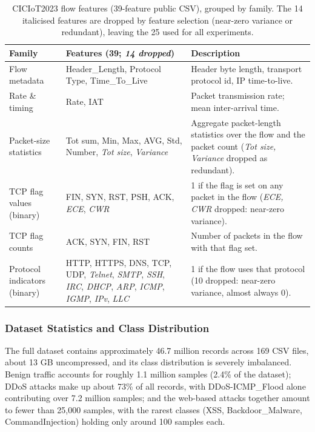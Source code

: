 \begin{table}[htbp]
\centering
\small
\begin{tabular}{|p{70pt}|p{150pt}|p{150pt}|}
\hline
\textbf{Family} & \textbf{Features (39; \emph{14 dropped})} & \textbf{Description} \\
\hline
Flow metadata & Header\_Length, Protocol Type, Time\_To\_Live &
Header byte length, transport protocol id, IP time-to-live. \\
\hline
Rate \& timing & Rate, IAT &
Packet transmission rate; mean inter-arrival time. \\
\hline
Packet-size statistics & Tot sum, Min, Max, AVG, Std, Number, \emph{Tot size}, \emph{Variance} &
Aggregate packet-length statistics over the flow and the packet count
(\emph{Tot size, Variance} dropped as redundant). \\
\hline
TCP flag values (binary) & FIN, SYN, RST, PSH, ACK, \emph{ECE}, \emph{CWR} &
1 if the flag is set on any packet in the flow (\emph{ECE, CWR} dropped: near-zero variance). \\
\hline
TCP flag counts & ACK, SYN, FIN, RST &
Number of packets in the flow with that flag set. \\
\hline
Protocol indicators (binary) & HTTP, HTTPS, DNS, TCP, UDP, \emph{Telnet}, \emph{SMTP}, \emph{SSH}, \emph{IRC}, \emph{DHCP}, \emph{ARP}, \emph{ICMP}, \emph{IGMP}, \emph{IPv}, \emph{LLC} &
1 if the flow uses that protocol (10 dropped: near-zero variance, almost always 0). \\
\hline
\end{tabular}
\caption{CICIoT2023 flow features (39-feature public CSV), grouped by family.
The 14 italicised features are dropped by feature selection (near-zero variance
or redundant), leaving the 25 used for all experiments.}
\label{tab:features}
\end{table}

\subsubsection{Dataset Statistics and Class Distribution}
\label{subsec:dataset_stats}

\par The full dataset contains approximately 46.7 million records across 169 CSV files, about 13 GB uncompressed, and its class distribution is severely imbalanced. Benign traffic accounts for roughly 1.1 million samples (2.4\% of the dataset); DDoS attacks make up about 73\% of all records, with DDoS-ICMP\_Flood alone contributing over 7.2 million samples; and the web-based attacks together amount to fewer than 25,000 samples, with the rarest classes (XSS, Backdoor\_Malware, CommandInjection) holding only around 100 samples each.

